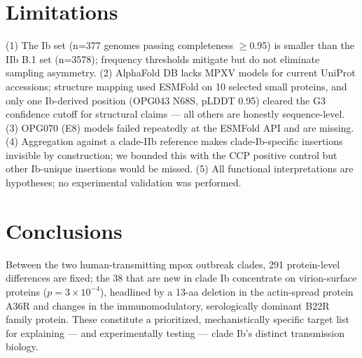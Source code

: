 \documentclass[11pt]{article}
\begin{document}
\section{Limitations}
(1) The Ib set (n=377 genomes passing completeness $\geq$0.95) is smaller than the IIb B.1 set
(n=3578); frequency thresholds mitigate but do not eliminate sampling asymmetry. (2) AlphaFold DB
lacks MPXV models for current UniProt accessions; structure mapping used ESMFold on 10 selected
small proteins, and only one Ib-derived position (OPG043 N68S, pLDDT 0.95) cleared the G3
confidence cutoff for structural claims --- all others are honestly sequence-level. (3) OPG070 (E8)
models failed repeatedly at the ESMFold API and are missing. (4) Aggregation against a clade-IIb
reference makes clade-Ib-specific insertions invisible by construction; we bounded this with the
CCP positive control but other Ib-unique insertions would be missed. (5) All functional
interpretations are hypotheses; no experimental validation was performed.

\section{Conclusions}
Between the two human-transmitting mpox outbreak clades, 291 protein-level differences are fixed;
the 38 that are new in clade Ib concentrate on virion-surface proteins ($p=3\times10^{-4}$),
headlined by a 13-aa deletion in the actin-spread protein A36R and changes in the
immunomodulatory, serologically dominant B22R family protein. These constitute a prioritized,
mechanistically specific target list for explaining --- and experimentally testing --- clade Ib's
distinct transmission biology.
\end{document}

